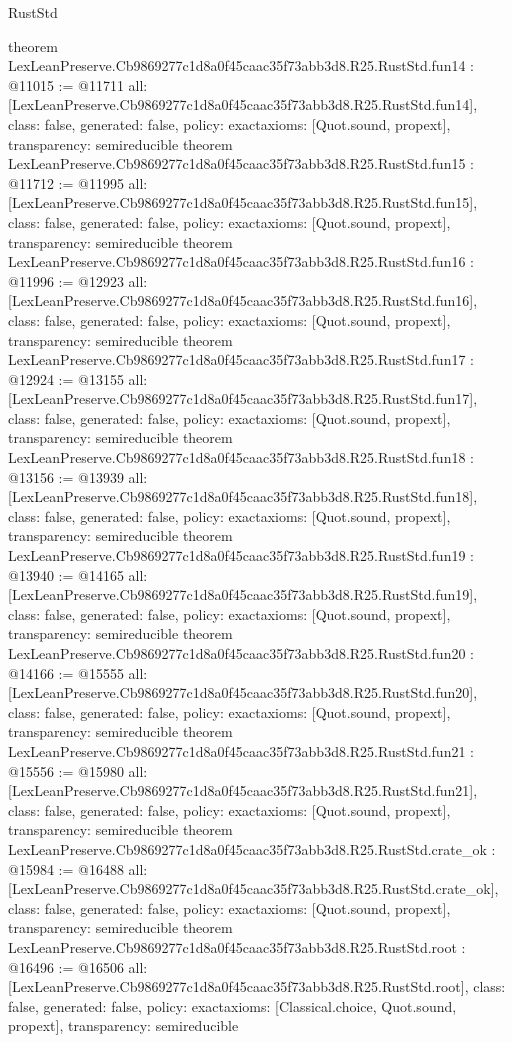 \begin{lexlean}{RustStd}
\begin{coremodule}
{}
theorem LexLeanPreserve.Cb9869277c1d8a0f45caac35f73abb3d8.R25.RustStd.fun14 : @11015 := @11711 {
  all: [LexLeanPreserve.Cb9869277c1d8a0f45caac35f73abb3d8.R25.RustStd.fun14],
  class: false,
  generated: false,
  policy: exact{axioms: [Quot.sound, propext]},
  transparency: semireducible
}
theorem LexLeanPreserve.Cb9869277c1d8a0f45caac35f73abb3d8.R25.RustStd.fun15 : @11712 := @11995 {
  all: [LexLeanPreserve.Cb9869277c1d8a0f45caac35f73abb3d8.R25.RustStd.fun15],
  class: false,
  generated: false,
  policy: exact{axioms: [Quot.sound, propext]},
  transparency: semireducible
}
theorem LexLeanPreserve.Cb9869277c1d8a0f45caac35f73abb3d8.R25.RustStd.fun16 : @11996 := @12923 {
  all: [LexLeanPreserve.Cb9869277c1d8a0f45caac35f73abb3d8.R25.RustStd.fun16],
  class: false,
  generated: false,
  policy: exact{axioms: [Quot.sound, propext]},
  transparency: semireducible
}
theorem LexLeanPreserve.Cb9869277c1d8a0f45caac35f73abb3d8.R25.RustStd.fun17 : @12924 := @13155 {
  all: [LexLeanPreserve.Cb9869277c1d8a0f45caac35f73abb3d8.R25.RustStd.fun17],
  class: false,
  generated: false,
  policy: exact{axioms: [Quot.sound, propext]},
  transparency: semireducible
}
theorem LexLeanPreserve.Cb9869277c1d8a0f45caac35f73abb3d8.R25.RustStd.fun18 : @13156 := @13939 {
  all: [LexLeanPreserve.Cb9869277c1d8a0f45caac35f73abb3d8.R25.RustStd.fun18],
  class: false,
  generated: false,
  policy: exact{axioms: [Quot.sound, propext]},
  transparency: semireducible
}
theorem LexLeanPreserve.Cb9869277c1d8a0f45caac35f73abb3d8.R25.RustStd.fun19 : @13940 := @14165 {
  all: [LexLeanPreserve.Cb9869277c1d8a0f45caac35f73abb3d8.R25.RustStd.fun19],
  class: false,
  generated: false,
  policy: exact{axioms: [Quot.sound, propext]},
  transparency: semireducible
}
theorem LexLeanPreserve.Cb9869277c1d8a0f45caac35f73abb3d8.R25.RustStd.fun20 : @14166 := @15555 {
  all: [LexLeanPreserve.Cb9869277c1d8a0f45caac35f73abb3d8.R25.RustStd.fun20],
  class: false,
  generated: false,
  policy: exact{axioms: [Quot.sound, propext]},
  transparency: semireducible
}
theorem LexLeanPreserve.Cb9869277c1d8a0f45caac35f73abb3d8.R25.RustStd.fun21 : @15556 := @15980 {
  all: [LexLeanPreserve.Cb9869277c1d8a0f45caac35f73abb3d8.R25.RustStd.fun21],
  class: false,
  generated: false,
  policy: exact{axioms: [Quot.sound, propext]},
  transparency: semireducible
}
theorem LexLeanPreserve.Cb9869277c1d8a0f45caac35f73abb3d8.R25.RustStd.crate_ok : @15984 := @16488 {
  all: [LexLeanPreserve.Cb9869277c1d8a0f45caac35f73abb3d8.R25.RustStd.crate_ok],
  class: false,
  generated: false,
  policy: exact{axioms: [Quot.sound, propext]},
  transparency: semireducible
}
theorem LexLeanPreserve.Cb9869277c1d8a0f45caac35f73abb3d8.R25.RustStd.root : @16496 := @16506 {
  all: [LexLeanPreserve.Cb9869277c1d8a0f45caac35f73abb3d8.R25.RustStd.root],
  class: false,
  generated: false,
  policy: exact{axioms: [Classical.choice, Quot.sound, propext]},
  transparency: semireducible
}


\end{coremodule}
\end{lexlean}

